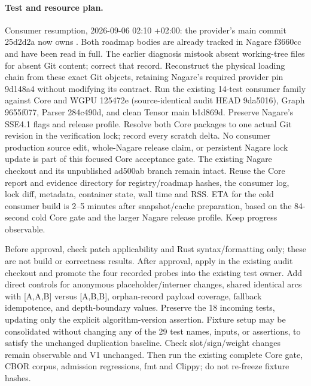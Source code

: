 \documentclass[11pt,a4paper]{article}
\begin{document}
\paragraph{Test and resource plan.}
Consumer resumption, 2026-09-06 02:10 +02:00: the provider's main commit
25d2d2a now owns . Both roadmap bodies are already
tracked in Nagare f3660cc and have been read in full. The earlier diagnosis
mistook absent working-tree files for absent Git content; correct that record.
Reconstruct the physical loading chain from these exact Git objects, retaining
Nagare's required provider pin 9d148a4 without modifying its contract.
Run the existing 14-test  consumer family against
Core and WGPU 125472e (source-identical audit HEAD 9da5016), Graph 9655f077,
Parser 284c490d, and clean Tensor main b1d869d. Preserve Nagare's SSE4.1 flags
and release profile. Resolve both Core packages to one actual Git revision in
the verification lock; record every scratch delta. No consumer production
source edit, whole-Nagare release claim, or persistent Nagare lock update is
part of this focused Core acceptance gate. The existing Nagare checkout and
its unpublished ad500ab branch remain intact. Reuse the Core report and evidence
directory for registry/roadmap hashes, the consumer log, lock diff, metadata,
container state, wall time and RSS. ETA for the cold consumer build is 2--5
minutes after snapshot/cache preparation, based on the 84-second cold Core
gate and the larger Nagare release profile. Keep progress observable.

Before approval, check patch applicability and Rust syntax/formatting only;
these are not build or correctness results. After approval, apply in the existing
audit checkout and promote the four recorded probes into the existing test owner.
Add direct controls for anonymous placeholder/interner changes, shared identical
arcs with [A,A,B] versus [A,B,B], orphan-record payload coverage, fallback
idempotence, and depth-boundary values. Preserve the 18 incoming tests, updating
only the explicit algorithm-version assertion. Fixture setup may be consolidated
without changing any of the 29 test names, inputs, or assertions, to satisfy the
unchanged duplication baseline. Check slot/sign/weight changes
remain observable and V1 unchanged. Then run the existing complete Core gate,
CBOR corpus, admission regressions, fmt and Clippy; do not re-freeze fixture hashes.
\end{document}
